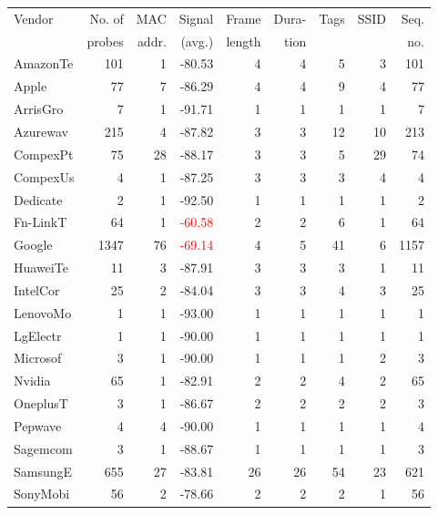 \begin{table}
\footnotesize
\begin{center}
  \begin{tabular}{lrrrrrrrr}
  \toprule
  Vendor & No. of & MAC & Signal & Frame & Dura-& Tags & SSID & Seq. \\ 
         & probes & addr. & (avg.) & length &  tion &  &  & no. \\ 
  \midrule
  AmazonTe &  101 &   1 & -80.53 &   4 &   4 &   5 &   3 & 101 \\ 
  Apple    &   77 &   7 & -86.29 &   4 &   4 &   9 &   4 &  77 \\ 
  ArrisGro &    7 &   1 & -91.71 &   1 &   1 &   1 &   1 &   7 \\ 
  Azurewav &  215 &   4 & -87.82 &   3 &   3 &  12 &  10 & 213 \\ 
  CompexPt &   75 &  28 & -88.17 &   3 &   3 &   5 &  29 &  74 \\ 
  CompexUs &    4 &   1 & -87.25 &   3 &   3 &   3 &   4 &   4 \\ 
  Dedicate &    2 &   1 & -92.50 &   1 &   1 &   1 &   1 &   2 \\ 
  Fn-LinkT &   64 &   1 & \textcolor{red}{-60.58} &   2 &   2 &   6 &   1 &  64 \\ 
  Google   & 1347 &  76 & \textcolor{red}{-69.14} &   4 &   5 &  41 &   6 & 1157 \\ 
  HuaweiTe &   11 &   3 & -87.91 &   3 &   3 &   3 &   1 &  11 \\ 
  IntelCor &   25 &   2 & -84.04 &   3 &   3 &   4 &   3 &  25 \\ 
  LenovoMo &    1 &   1 & -93.00 &   1 &   1 &   1 &   1 &   1 \\ 
  LgElectr &    1 &   1 & -90.00 &   1 &   1 &   1 &   1 &   1 \\ 
  Microsof &    3 &   1 & -90.00 &   1 &   1 &   1 &   2 &   3 \\ 
  Nvidia   &   65 &   1 & -82.91 &   2 &   2 &   4 &   2 &  65 \\ 
  OneplusT &    3 &   1 & -86.67 &   2 &   2 &   2 &   2 &   3 \\ 
  Pepwave  &    4 &   4 & -90.00 &   1 &   1 &   1 &   1 &   4 \\ 
  Sagemcom &    3 &   1 & -88.67 &   1 &   1 &   1 &   1 &   3 \\ 
  SamsungE &  655 &  27 & -83.81 &  26 &  26 &  54 &  23 & 621 \\ 
  SonyMobi &   56 &   2 & -78.66 &   2 &   2 &   2 &   1 &  56 \\ 

\end{tabular}
\end{center}
\end{table}
